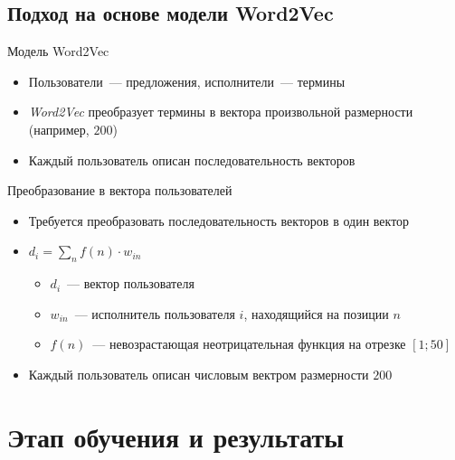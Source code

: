 \documentclass{beamer}
\begin{document}
\subsection{Подход на основе модели Word2Vec}

\begin{frame}{Модель Word2Vec}
  \begin{itemize}
      \item {Пользователи~--- предложения, исполнители~--- термины}
      \pause
      \item {\textit{Word2Vec} преобразует термины в вектора произвольной размерности (например, $200$)}
      \pause
      \item {Каждый пользователь описан последовательность векторов} 
  \end{itemize}
\end{frame}

\begin{frame}{Преобразование в вектора пользователей}
  \begin{itemize}
      \item {Требуется преобразовать последовательность векторов в один вектор}
      \pause
      \item {$d_{i} = \sum\limits_{n}{f(n) \cdot w_{in}}$}
          \begin{itemize}
              \item {$d_{i}$~--- вектор пользователя}
              \item {$w_{in}$~--- исполнитель пользователя $i$, находящийся на позиции $n$}
              \item {$f(n)$~--- невозрастающая неотрицательная функция на отрезке $[1; 50]$}
          \end{itemize}
      \pause
      \item {Каждый пользователь описан числовым вектром размерности $200$}
  \end{itemize}
\end{frame}

\section{Этап обучения и результаты}
\end{document}
